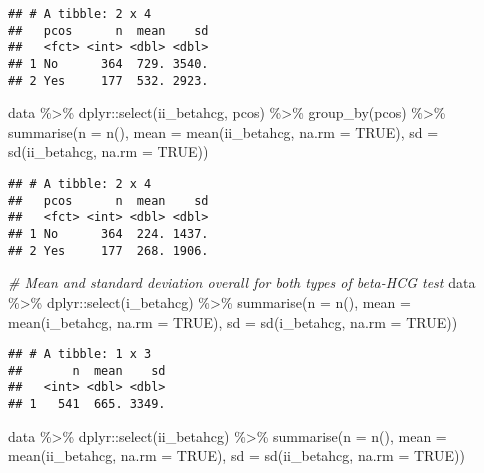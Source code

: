 \documentclass[
]{article}
\newenvironment{Shaded}{\begin{snugshade}}{\end{snugshade}}
\newcommand{\AttributeTok}[1]{\textcolor[rgb]{0.77,0.63,0.00}{#1}}
\newcommand{\CommentTok}[1]{\textcolor[rgb]{0.56,0.35,0.01}{\textit{#1}}}
\newcommand{\ConstantTok}[1]{\textcolor[rgb]{0.00,0.00,0.00}{#1}}
\newcommand{\FunctionTok}[1]{\textcolor[rgb]{0.00,0.00,0.00}{#1}}
\newcommand{\NormalTok}[1]{#1}
\newcommand{\SpecialCharTok}[1]{\textcolor[rgb]{0.00,0.00,0.00}{#1}}
\begin{document}
\begin{verbatim}
## # A tibble: 2 x 4
##   pcos      n  mean    sd
##   <fct> <int> <dbl> <dbl>
## 1 No      364  729. 3540.
## 2 Yes     177  532. 2923.
\end{verbatim}

\begin{Shaded}
\begin{Highlighting}[]
\NormalTok{data }\SpecialCharTok{\%\textgreater{}\%}\NormalTok{ dplyr}\SpecialCharTok{::}\FunctionTok{select}\NormalTok{(ii\_betahcg, pcos) }\SpecialCharTok{\%\textgreater{}\%} \FunctionTok{group\_by}\NormalTok{(pcos) }\SpecialCharTok{\%\textgreater{}\%} 
  \FunctionTok{summarise}\NormalTok{(}\AttributeTok{n =} \FunctionTok{n}\NormalTok{(), }
            \AttributeTok{mean =} \FunctionTok{mean}\NormalTok{(ii\_betahcg, }\AttributeTok{na.rm =} \ConstantTok{TRUE}\NormalTok{), }
            \AttributeTok{sd =} \FunctionTok{sd}\NormalTok{(ii\_betahcg, }\AttributeTok{na.rm =} \ConstantTok{TRUE}\NormalTok{))}
\end{Highlighting}
\end{Shaded}

\begin{verbatim}
## # A tibble: 2 x 4
##   pcos      n  mean    sd
##   <fct> <int> <dbl> <dbl>
## 1 No      364  224. 1437.
## 2 Yes     177  268. 1906.
\end{verbatim}

\begin{Shaded}
\begin{Highlighting}[]
\CommentTok{\# Mean and standard deviation overall for both types of beta{-}HCG test}
\NormalTok{data }\SpecialCharTok{\%\textgreater{}\%}\NormalTok{ dplyr}\SpecialCharTok{::}\FunctionTok{select}\NormalTok{(i\_betahcg) }\SpecialCharTok{\%\textgreater{}\%} 
  \FunctionTok{summarise}\NormalTok{(}\AttributeTok{n =} \FunctionTok{n}\NormalTok{(), }
            \AttributeTok{mean =} \FunctionTok{mean}\NormalTok{(i\_betahcg, }\AttributeTok{na.rm =} \ConstantTok{TRUE}\NormalTok{), }
            \AttributeTok{sd =} \FunctionTok{sd}\NormalTok{(i\_betahcg, }\AttributeTok{na.rm =} \ConstantTok{TRUE}\NormalTok{))}
\end{Highlighting}
\end{Shaded}

\begin{verbatim}
## # A tibble: 1 x 3
##       n  mean    sd
##   <int> <dbl> <dbl>
## 1   541  665. 3349.
\end{verbatim}

\begin{Shaded}
\begin{Highlighting}[]
\NormalTok{data }\SpecialCharTok{\%\textgreater{}\%}\NormalTok{ dplyr}\SpecialCharTok{::}\FunctionTok{select}\NormalTok{(ii\_betahcg) }\SpecialCharTok{\%\textgreater{}\%} 
  \FunctionTok{summarise}\NormalTok{(}\AttributeTok{n =} \FunctionTok{n}\NormalTok{(), }
            \AttributeTok{mean =} \FunctionTok{mean}\NormalTok{(ii\_betahcg, }\AttributeTok{na.rm =} \ConstantTok{TRUE}\NormalTok{), }
            \AttributeTok{sd =} \FunctionTok{sd}\NormalTok{(ii\_betahcg, }\AttributeTok{na.rm =} \ConstantTok{TRUE}\NormalTok{))}
\end{Highlighting}
\end{Shaded}
\end{document}
